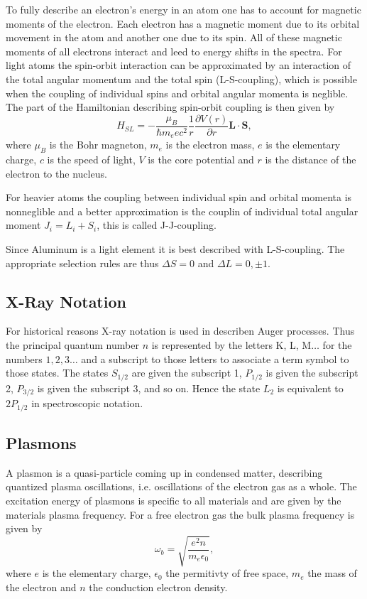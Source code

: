 \documentclass[a4paper,10pt]{scrartcl}
\begin{document}
To fully describe an electron's energy in an atom one has to account for magnetic moments of the electron. Each electron has a magnetic moment due to its orbital movement in the atom and another one due to its spin. All of these magnetic moments of all electrons interact and leed to energy shifts in the spectra. For light atoms the spin-orbit interaction can be approximated by an interaction of the total angular momentum and the total spin (L-S-coupling), which is possible when the coupling of individual spins and orbital angular momenta is neglible. The part of the Hamiltonian describing spin-orbit coupling is then given by
\begin{equation}
H_{SL} = - \frac{\mu_B}{\hbar m_e e c^2}\frac{1}{r}\frac{\partial V(r)}{\partial r} \boldsymbol{L}\cdot\boldsymbol{S},
\end{equation}
where $\mu_B$ is the Bohr magneton, $m_e$ is the electron mass, $e$ is the elementary charge, $c$ is the speed of light, $V$ is the core potential and $r$ is the distance of the electron to the nucleus.

For heavier atoms the coupling between individual spin and orbital momenta is nonneglible and a better approximation is the couplin of individual total angular moment $J_i=L_i+S_i$, this is called J-J-coupling.

Since Aluminum is a light element it is best described with L-S-coupling. The appropriate selection rules are thus $\Delta S=0$ and $\Delta L = 0, \pm 1$.

\subsection{X-Ray Notation}

For historical reasons X-ray notation is used in describen Auger processes. Thus the principal quantum number $n$ is represented by the letters K, L, M$\ldots$ for the numbers $1, 2, 3 \ldots$ and a subscript to those letters to associate a term symbol to those states. The states $S_{1/2}$ are given the subscript 1, $P_{1/2}$ is given the subscript 2, $P_{3/2}$ is given the subscript 3, and so on. Hence the state $L_2$ is equivalent to $2P_{1/2}$ in spectroscopic notation.

\subsection{Plasmons}

A plasmon is a quasi-particle coming up in condensed matter, describing quantized plasma oscillations, i.e. oscillations of the electron gas as a whole. The excitation energy of plasmons is specific to all materials and are given by the materials plasma frequency. For a free electron gas the bulk plasma frequency is given by
\begin{equation}
\omega_{b} = \sqrt{\frac{e^2 n}{m_e \epsilon_0}},
\end{equation}
where $e$ is the elementary charge, $\epsilon_0$ the permitivty of free space, $m_e$ the mass of the electron and $n$ the conduction electron density. 
\end{document}
